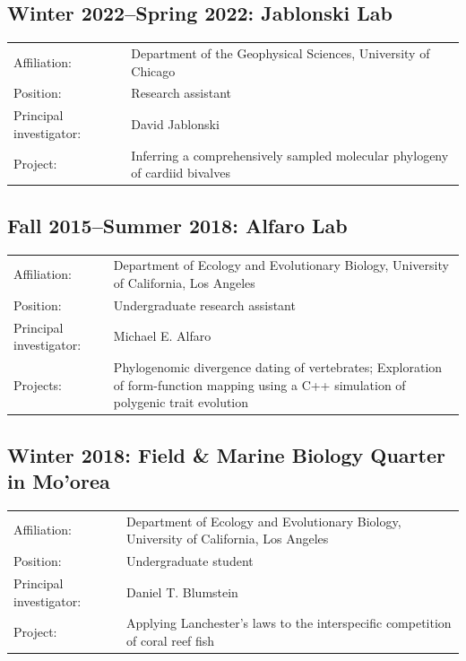 \documentclass[10pt]{article}
\begin{document}
\subsection*{Winter 2022--Spring 2022: Jablonski Lab}

\begin{tabularx}{\textwidth}{>{\raggedleft\arraybackslash}p{3.6cm} X}
Affiliation: & Department of the Geophysical Sciences, University of Chicago \\[0.1cm]
Position: & Research assistant \\[0.1cm]
Principal investigator: & David Jablonski \\[0.1cm]
Project: & Inferring a comprehensively sampled molecular phylogeny of cardiid bivalves
\end{tabularx}

\subsection*{Fall 2015--Summer 2018: Alfaro Lab}

\begin{tabularx}{\textwidth}{>{\raggedleft\arraybackslash}p{3.6cm} X}
Affiliation: & Department of Ecology and Evolutionary Biology, University of California, Los Angeles \\[0.1cm]
Position: & Undergraduate research assistant \\[0.1cm]
Principal investigator: & Michael E. Alfaro \\[0.1cm]
Projects: & Phylogenomic divergence dating of vertebrates; Exploration of form-function mapping using a \textsf{C++} simulation of polygenic trait evolution
\end{tabularx}

\subsection*{Winter 2018: Field \& Marine Biology Quarter in Mo'orea}

\begin{tabularx}{\textwidth}{>{\raggedleft\arraybackslash}p{3.6cm} X}
Affiliation: & Department of Ecology and Evolutionary Biology, University of California, Los Angeles \\[0.1cm]
Position: & Undergraduate student \\[0.1cm]
Principal investigator: & Daniel T. Blumstein \\[0.1cm]
Project: & Applying Lanchester's laws to the interspecific competition of coral reef fish
\end{tabularx}
\end{document}

